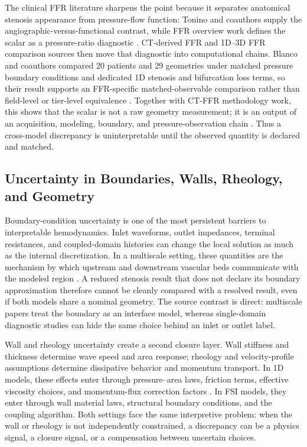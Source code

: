 The clinical FFR literature sharpens the point because it separates anatomical
stenosis appearance from pressure-flow function: Tonino and coauthors supply
the angiographic-versus-functional contrast, while FFR overview work defines
the scalar as a pressure-ratio diagnostic
\cite{ToninoEtAl2010FAMEAngioFunctional,TebaldiEtAl2015FFROverview}.
CT-derived FFR and 1D--3D FFR comparison sources then move that diagnostic into
computational chains. Blanco and coauthors compared 20 patients and 29
geometries under matched pressure boundary conditions and dedicated 1D stenosis
and bifurcation loss terms, so their result supports an FFR-specific
matched-observable comparison rather than field-level or tier-level equivalence
\cite{Blanco2018FFR1D3D}. Together with CT-FFR methodology work, this shows
that the scalar is not a raw geometry measurement; it is an output of an
acquisition, modeling, boundary, and pressure-observation chain
\cite{NorgaardEtAl2014NXTFFRCT,ShaikhEtAl2025CTFFR}. Thus a cross-model
discrepancy is uninterpretable until the observed quantity is declared and
matched.

\subsection{Uncertainty in Boundaries, Walls, Rheology, and Geometry}
\label{subsec:synthesis-closure-geometry-uncertainty}

Boundary-condition uncertainty is one of the most persistent barriers to
interpretable hemodynamics. Inlet waveforms, outlet impedances, terminal
resistances, and coupled-domain histories can change the local solution as much
as the internal discretization. In a multiscale setting, these quantities are
the mechanism by which upstream and downstream vascular beds communicate with
the modeled region
\cite{QuarteroniVeneziani2003GeometricalMultiscale,FormaggiaEtAl2007FSICoupling}.
A reduced stenosis result that does not declare its boundary approximation
therefore cannot be cleanly compared with a resolved result, even if both
models share a nominal geometry. The source contrast is direct: multiscale
papers treat the boundary as an interface model, whereas single-domain
diagnostic studies can hide the same choice behind an inlet or outlet label.

Wall and rheology uncertainty create a second closure layer. Wall stiffness and
thickness determine wave speed and area response; rheology and velocity-profile
assumptions determine dissipative behavior and momentum transport. In 1D
models, these effects enter through pressure--area laws, friction terms,
effective viscosity choices, and momentum-flux correction factors
\cite{ShiEtAl2011BloodFlowModelReview}. In FSI models, they enter through wall
material laws, structural boundary conditions, and the coupling algorithm. Both
settings face the same interpretive problem: when the wall or rheology is not
independently constrained, a discrepancy can be a physics signal, a closure
signal, or a compensation between uncertain choices.


